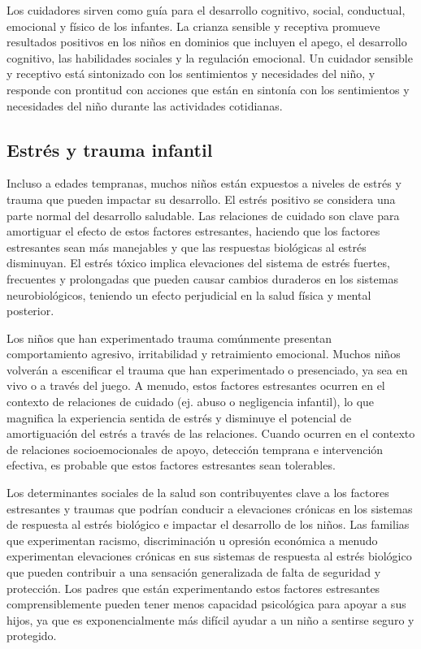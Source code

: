 \documentclass[11pt,letterpaper]{report}
\begin{document}
Los cuidadores sirven como guía para el desarrollo cognitivo, social,
conductual, emocional y físico de los infantes. La crianza sensible y receptiva
promueve resultados positivos en los niños en dominios que incluyen el apego,
el desarrollo cognitivo, las habilidades sociales y la regulación emocional.
Un cuidador sensible y receptivo está sintonizado con los sentimientos y
necesidades del niño, y responde con prontitud con acciones que están en
sintonía con los sentimientos y necesidades del niño durante las
actividades cotidianas. \cite{Feldman3}

\subsection{Estrés y trauma infantil}
Incluso a edades tempranas, muchos niños están expuestos a niveles de estrés y
trauma que pueden impactar su desarrollo. El estrés positivo se considera una
parte normal del desarrollo saludable. Las relaciones de cuidado son clave para
amortiguar el efecto de estos factores estresantes, haciendo que los factores
estresantes sean más manejables y que las respuestas biológicas al estrés
disminuyan. El estrés tóxico implica elevaciones del sistema de estrés fuertes,
frecuentes y prolongadas que pueden causar cambios duraderos en los sistemas
neurobiológicos, teniendo un efecto perjudicial en la salud física y mental
posterior. \cite{Feldman3}

Los niños que han experimentado trauma comúnmente presentan comportamiento
agresivo, irritabilidad y retraimiento emocional. Muchos niños volverán a
escenificar el trauma que han experimentado o presenciado, ya sea en vivo o a
través del juego. A menudo, estos factores estresantes ocurren en el contexto
de relaciones de cuidado (ej. abuso o negligencia infantil), lo que magnifica la
experiencia sentida de estrés y disminuye el potencial de amortiguación del
estrés a través de las relaciones. Cuando ocurren en el contexto de relaciones
socioemocionales de apoyo, detección temprana e intervención efectiva, es
probable que estos factores estresantes sean tolerables. \cite{Feldman3}

Los determinantes sociales de la salud son contribuyentes clave a los factores
estresantes y traumas que podrían conducir a elevaciones crónicas en los
sistemas de respuesta al estrés biológico e impactar el desarrollo de los
niños. Las familias que experimentan racismo, discriminación u opresión
económica a menudo experimentan elevaciones crónicas en sus sistemas de
respuesta al estrés biológico que pueden contribuir a una sensación
generalizada de falta de seguridad y protección. Los padres que están
experimentando estos factores estresantes comprensiblemente pueden tener menos
capacidad psicológica para apoyar a sus hijos, ya que es exponencialmente más
difícil ayudar a un niño a sentirse seguro y protegido. \cite{Feldman3}
\end{document}

